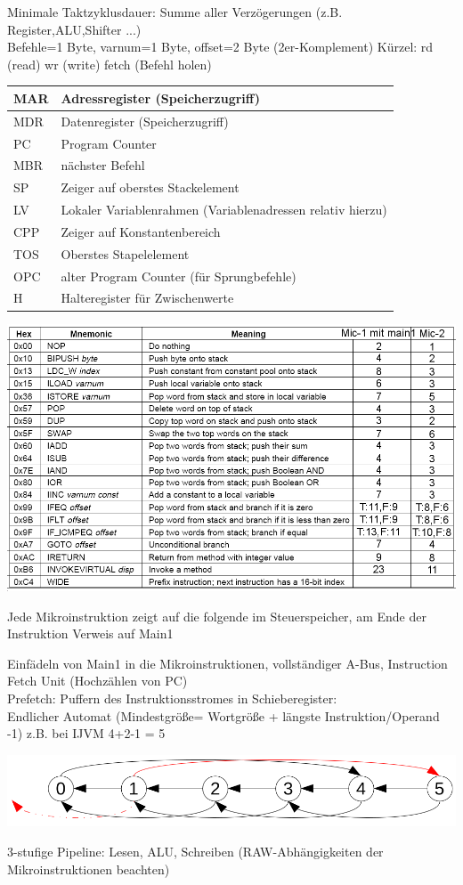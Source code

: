 


Minimale Taktzyklusdauer: Summe aller Verzögerungen (z.B. Register,ALU,Shifter ...)\\
Befehle=1 Byte, varnum=1 Byte, offset=2 Byte (2er-Komplement)
Kürzel: rd (read) wr (write) fetch (Befehl holen)

\begin{tabular}{|l|l|}
\hline
MAR & Adressregister (Speicherzugriff)\\
\hline
MDR & Datenregister (Speicherzugriff)\\
\hline
PC & Program Counter\\
\hline
MBR & nächster Befehl\\
\hline
SP & Zeiger auf oberstes Stackelement\\
\hline
LV & Lokaler Variablenrahmen (Variablenadressen relativ hierzu)\\
\hline
CPP & Zeiger auf Konstantenbereich	\\
\hline
TOS & Oberstes Stapelelement\\
\hline
OPC & alter Program Counter (für Sprungbefehle)\\
\hline
H & Halteregister für Zwischenwerte\\
\hline
\end{tabular}

\includegraphics[width=\textwidth]{ALU-Operationen} 

Jede Mikroinstruktion zeigt auf die folgende im Steuerspeicher, am Ende der Instruktion Verweis auf Main1

Einfädeln von Main1 in die Mikroinstruktionen, vollständiger A-Bus, Instruction Fetch Unit (Hochzählen von PC)\\
Prefetch: Puffern des Instruktionsstromes in Schieberegister: \\
Endlicher Automat (Mindestgröße= Wortgröße + längste Instruktion/Operand -1) z.B. bei IJVM 4+2-1 = 5 

\includegraphics[width=\textwidth]{IFU}

3-stufige Pipeline: Lesen, ALU, Schreiben (RAW-Abhängigkeiten der Mikroinstruktionen beachten) \\ \\

